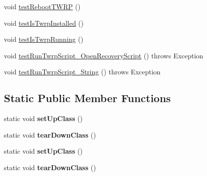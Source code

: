 \begin{DoxyCompactItemize}
\item 
void \hyperlink{class_c_a_s_u_a_l_1_1communicationstools_1_1adb_1_1twrprecovery_1_1_twrp_communications_test_a5a4d7eee88151e0fc3793164f64bb4b5}{test\-Reboot\-T\-W\-R\-P} ()
\item 
void \hyperlink{class_c_a_s_u_a_l_1_1communicationstools_1_1adb_1_1twrprecovery_1_1_twrp_communications_test_a0073bbc92106964d6930e36e4f7a5e1c}{test\-Is\-Twrp\-Installed} ()
\item 
void \hyperlink{class_c_a_s_u_a_l_1_1communicationstools_1_1adb_1_1twrprecovery_1_1_twrp_communications_test_a9be7e808dbc296ed18f6c9b31b2f0e9f}{test\-Is\-Twrp\-Running} ()
\item 
void \hyperlink{class_c_a_s_u_a_l_1_1communicationstools_1_1adb_1_1twrprecovery_1_1_twrp_communications_test_a8df3cf9e455dd49c7f9115e75dfbce29}{test\-Run\-Twrp\-Script\-\_\-\-Open\-Recovery\-Script} ()  throws Exception 
\item 
void \hyperlink{class_c_a_s_u_a_l_1_1communicationstools_1_1adb_1_1twrprecovery_1_1_twrp_communications_test_a4367c1a2e9b517dde213baeb460ff00f}{test\-Run\-Twrp\-Script\-\_\-\-String} ()  throws Exception 
\end{DoxyCompactItemize}
\subsection*{Static Public Member Functions}
\begin{DoxyCompactItemize}
\item 
\hypertarget{class_c_a_s_u_a_l_1_1communicationstools_1_1adb_1_1twrprecovery_1_1_twrp_communications_test_af4219ce0c9d62ed3bc99597abf23c7c9}{static void {\bfseries set\-Up\-Class} ()}\label{class_c_a_s_u_a_l_1_1communicationstools_1_1adb_1_1twrprecovery_1_1_twrp_communications_test_af4219ce0c9d62ed3bc99597abf23c7c9}

\item 
\hypertarget{class_c_a_s_u_a_l_1_1communicationstools_1_1adb_1_1twrprecovery_1_1_twrp_communications_test_a52eae26318c561acb46a90760c750cd4}{static void {\bfseries tear\-Down\-Class} ()}\label{class_c_a_s_u_a_l_1_1communicationstools_1_1adb_1_1twrprecovery_1_1_twrp_communications_test_a52eae26318c561acb46a90760c750cd4}

\item 
\hypertarget{class_c_a_s_u_a_l_1_1communicationstools_1_1adb_1_1twrprecovery_1_1_twrp_communications_test_af4219ce0c9d62ed3bc99597abf23c7c9}{static void {\bfseries set\-Up\-Class} ()}\label{class_c_a_s_u_a_l_1_1communicationstools_1_1adb_1_1twrprecovery_1_1_twrp_communications_test_af4219ce0c9d62ed3bc99597abf23c7c9}

\item 
\hypertarget{class_c_a_s_u_a_l_1_1communicationstools_1_1adb_1_1twrprecovery_1_1_twrp_communications_test_a52eae26318c561acb46a90760c750cd4}{static void {\bfseries tear\-Down\-Class} ()}\label{class_c_a_s_u_a_l_1_1communicationstools_1_1adb_1_1twrprecovery_1_1_twrp_communications_test_a52eae26318c561acb46a90760c750cd4}

\end{DoxyCompactItemize}



